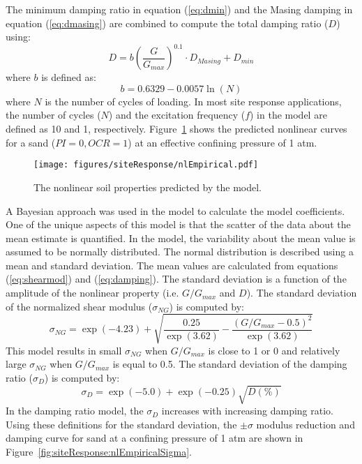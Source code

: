 \documentclass[12pt,oneside]{book}
\begin{document}
The minimum damping ratio in equation (\ref{eq:dmin}) and the Masing damping in equation
(\ref{eq:dmasing}) are combined to compute the total damping ratio ($D$) using:
\begin{equation}
    D = b  \left( \frac{G}{G_{max}} \right)^{0.1} \cdot D_{Masing} + D_{min} 
    \label{eq:damping}
\end{equation}
where $b$ is defined as:
\begin{equation}
    b = 0.6329 - 0.0057 \ln\left( N \right)
\end{equation}
where $N$ is the number of cycles of loading.  In most site response applications, the number of
cycles ($N$) and the excitation frequency ($f$) in the model are defined as 10 and 1,
respectively.  Figure~\ref{fig:siteResponse:nlEmpirical} shows the predicted nonlinear curves for a sand
($PI=0, OCR=1$) at an effective confining pressure of 1 atm.

\begin{figure}[tb]
    \begin{center}
        \texttt{[image: figures/siteResponse/nlEmpirical.pdf]}
    \end{center}
    \caption{The nonlinear soil properties predicted by the \citet{darendeli:01} model.}
    \label{fig:siteResponse:nlEmpirical}
\end{figure}

A Bayesian approach was used in the \citet{darendeli:01} model to calculate the model coefficients.
One of the unique aspects of this model is that the scatter of the data about the mean estimate is
quantified.  In the \citet{darendeli:01} model, the variability about the mean value is assumed to
be normally distributed.  The normal distribution is described using a mean and standard deviation.
The mean values are calculated from equations (\ref{eq:shearmod}) and (\ref{eq:damping}). The
standard deviation is a function of the amplitude of the nonlinear property (i.e. $G/G_{max}$ and
$D$).  The standard deviation of the normalized shear modulus ($\sigma_{NG}$) is computed by:
\begin{equation}
    \sigma_{NG} = \exp(-4.23) + \sqrt{ \frac{0.25}{\exp(3.62)} - \frac{\left(G/G_{max} -
    0.5\right)^2}{\exp(3.62)} }
    \label{eq:sigmaShear}
\end{equation}
This model results in small $\sigma_{NG}$ when $G/G_{max}$ is close to 1 or 0 and relatively large
$\sigma_{NG}$ when $G/G_{max}$ is equal to 0.5. The standard deviation of the damping ratio
($\sigma_{D}$) is computed by:
\begin{equation}
    \sigma_{D} = \exp(-5.0) + \exp(-0.25) \sqrt{D (\%)}
    \label{eq:sigmaDamping}
\end{equation}
In the damping ratio model, the $\sigma_{D}$ increases with increasing damping ratio.  Using these
definitions for the standard deviation, the $\pm\sigma$ modulus reduction and damping curve for sand
at a confining pressure of 1 atm are shown in Figure~\ref{fig:siteResponse:nlEmpiricalSigma}.
\end{document}
